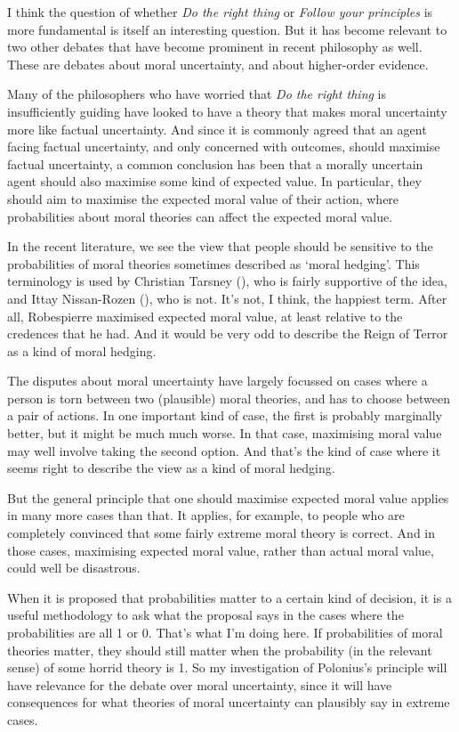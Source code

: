 \documentclass[
  10pt,
  letterpaper,
  twoside]{scrbook}
\begin{document}
I think the question of whether \emph{Do the right thing} or
\emph{Follow your principles} is more fundamental is itself an
interesting question. But it has become relevant to two other debates
that have become prominent in recent philosophy as well. These are
debates about moral uncertainty, and about higher-order evidence.

Many of the philosophers who have worried that \emph{Do the right thing}
is insufficiently guiding have looked to have a theory that makes moral
uncertainty more like factual uncertainty. And since it is commonly
agreed that an agent facing factual uncertainty, and only concerned with
outcomes, should maximise factual uncertainty, a common conclusion has
been that a morally uncertain agent should also maximise some kind of
expected value. In particular, they should aim to maximise the expected
moral value of their action, where probabilities about moral theories
can affect the expected moral value.

In the recent literature, we see the view that people should be
sensitive to the probabilities of moral theories sometimes described as
`moral hedging'. This terminology is used by Christian Tarsney
(), who is fairly supportive of the
idea, and Ittay Nissan-Rozen (), who
is not. It's not, I think, the happiest term. After all, {Robespierre}
maximised expected moral value, at least relative to the credences that
he had. And it would be very odd to describe the Reign of Terror as a
kind of moral hedging.

The disputes about moral uncertainty have largely focussed on cases
where a person is torn between two (plausible) moral theories, and has
to choose between a pair of actions. In one important kind of case, the
first is probably marginally better, but it might be much much worse. In
that case, maximising moral value may well involve taking the second
option. And that's the kind of case where it seems right to describe the
view as a kind of moral hedging.

But the general principle that one should maximise expected moral value
applies in many more cases than that. It applies, for example, to people
who are completely convinced that some fairly extreme moral theory is
correct. And in those cases, maximising expected moral value, rather
than actual moral value, could well be disastrous.

When it is proposed that probabilities matter to a certain kind of
decision, it is a useful methodology to ask what the proposal says in
the cases where the probabilities are all 1 or 0. That's what I'm doing
here. If probabilities of moral theories matter, they should still
matter when the probability (in the relevant sense) of some horrid
theory is 1. So my investigation of Polonius's principle will have
relevance for the debate over moral uncertainty, since it will have
consequences for what theories of moral uncertainty can plausibly say in
extreme cases.
\end{document}
